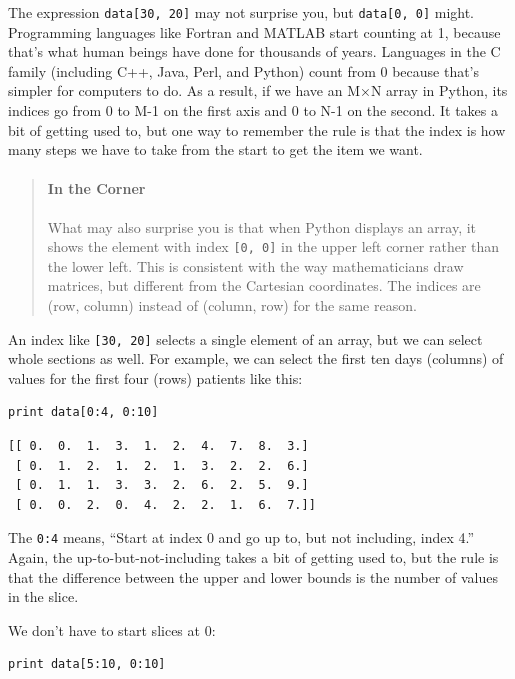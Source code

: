 \documentclass{book}
\begin{document}
The expression \texttt{data{[}30, 20{]}} may not surprise you, but
\texttt{data{[}0, 0{]}} might. Programming languages like Fortran and
MATLAB start counting at 1, because that's what human beings have done
for thousands of years. Languages in the C family (including C++, Java,
Perl, and Python) count from 0 because that's simpler for computers to
do. As a result, if we have an M×N array in Python, its indices go from
0 to M-1 on the first axis and 0 to N-1 on the second. It takes a bit of
getting used to, but one way to remember the rule is that the index is
how many steps we have to take from the start to get the item we want.

\begin{quote}
\mbox{}\paragraph{In the Corner}

What may also surprise you is that when Python displays an array, it
shows the element with index \texttt{{[}0, 0{]}} in the upper left
corner rather than the lower left. This is consistent with the way
mathematicians draw matrices, but different from the Cartesian
coordinates. The indices are (row, column) instead of (column, row) for
the same reason.
\end{quote}

An index like \texttt{{[}30, 20{]}} selects a single element of an
array, but we can select whole sections as well. For example, we can
select the first ten days (columns) of values for the first four (rows)
patients like this:

\begin{verbatim}
print data[0:4, 0:10]
\end{verbatim}

\begin{verbatim}
[[ 0.  0.  1.  3.  1.  2.  4.  7.  8.  3.]
 [ 0.  1.  2.  1.  2.  1.  3.  2.  2.  6.]
 [ 0.  1.  1.  3.  3.  2.  6.  2.  5.  9.]
 [ 0.  0.  2.  0.  4.  2.  2.  1.  6.  7.]]
\end{verbatim}

The  \texttt{0:4} means, ``Start at index 0 and
go up to, but not including, index 4.'' Again, the
up-to-but-not-including takes a bit of getting used to, but the rule is
that the difference between the upper and lower bounds is the number of
values in the slice.

We don't have to start slices at 0:

\begin{verbatim}
print data[5:10, 0:10]
\end{verbatim}
\end{document}
